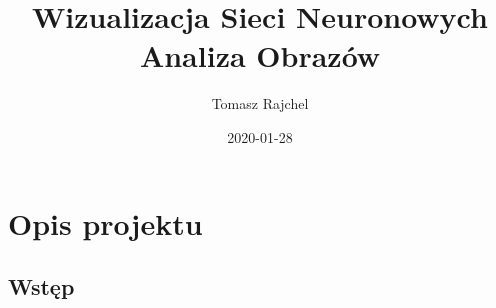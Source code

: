 \documentclass{article}
\title{Wizualizacja Sieci Neuronowych\\Analiza Obrazów}
\date{2020-01-28}
\author{Tomasz Rajchel}
\begin{document}
	\maketitle

	\tableofcontents
	\newpage
	
	\section{Opis projektu}
	\subsection{Wstęp}
	
\end{document}
